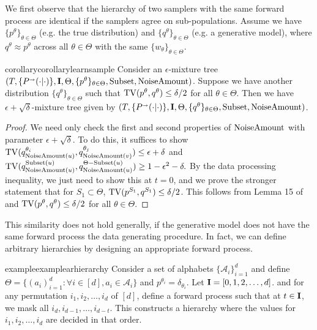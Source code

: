 We first observe that the hierarchy of two samplers with the same forward process are identical if the samplers agree on sub-populations. Assume we have $\{p^\theta\}_{\theta \in \Theta}$ (e.g. the true distribution) and $\{q^\theta\}_{\theta \in \Theta}$ (e.g. a generative model), where $q^\theta \approx p^\theta$ across all $\theta \in \Theta$ with the same $\{w_\theta\}_{\theta \in \Theta}$. 
\begin{restatable}{corollary}{corollarylearnsample}\label{corr:learn_sample}
Consider an $\epsilon$-mixture tree $(T,\{\kernelforward(\cdot  |\cdot)\},\I,\Theta,\{p^\theta\}_{\theta \in \Theta},\text{\subsetfunc},\text{\noiseamount})$. Suppose we have another distribution $\{q^\theta\}_{\theta \in \Theta}$ such that $\mathrm{TV}(p^\theta,q^\theta) \leq \delta/2$ for all $\theta \in \Theta$. Then we have $\epsilon+\sqrt{\delta}$-mixture tree given by $(T,\{\kernelforward(\cdot  |\cdot)\},\I,\Theta,\{q^\theta\}_{\theta \in \Theta},\text{\subsetfunc},\text{\noiseamount})$.
\end{restatable}
\begin{proof}
We need only check the first and second properties of $\textrm{NoiseAmount}$ with parameter $\epsilon+\sqrt{\delta}$. To do this, it suffices to show $\mathrm{TV}(q^{\theta_i}_{\textrm{NoiseAmount}(u)},q^{\theta_j}_{\textrm{NoiseAmount}(v)}) \leq \epsilon+\delta$ and $\mathrm{TV}(q^{\textrm{Subset}(u)}_{\textrm{NoiseAmount}(u)},q^{\Theta-\textrm{Subset}(u)}_{\textrm{NoiseAmount}(u)}) \geq 1-\epsilon^2-\delta.$ By the data processing inequality, we just need to show this at $t=0$, and we prove the stronger statement that for $S_1 \subset \Theta$, $\mathrm{TV}(p^{S_1},q^{S_1}) \leq \delta/2$. This follows from Lemma 15 of \citep{li2024criticalwindowsnonasymptotictheory} and $\mathrm{TV}(p^\theta,q^\theta) \leq \delta/2$ for all $\theta \in \Theta$. 
\end{proof}

This similarity does not hold generally, if the generative model does not have the same forward process the data generating procedure. In fact, we can define arbitrary hierarchies by designing an appropriate forward process. 
\begin{restatable}{example}{examplearhierarchy}\label{ex:autoregressive_hierarchy}
Consider a set of alphabets $\{\mathcal{A}_i\}_{i=1}^d$ and define $\Theta=\{(a_i)_{i=1}^d: \forall i \in [d], a_i \in \mathcal{A}_i \}$ and $p^{\theta_i} = \delta_{\theta_i}$. 
Let $\mathbf{I}=[0,1,2,\dots,d]$. and for any permutation $i_1,i_2,\dots,i_d$ of $[d]$, define a forward process such that at $t \in \mathbf{I}$, we mask all $i_d,i_{d-1},\dots,i_{d-t}$. This constructs a hierarchy where the values for $i_1,i_2,\dots,i_d$ are decided in that order. \end{restatable} 

